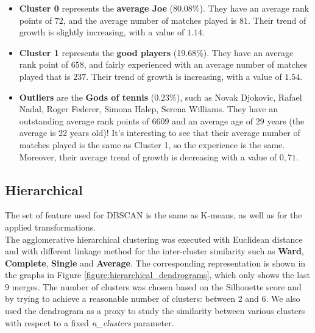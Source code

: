 \begin{itemize}
    \item \textbf{Cluster 0} represents the \textbf{average Joe} (80.08\%). They have an average rank points of $72$, and the average number of matches played is $81$. Their trend of growth is slightly increasing, with a value of $1.14$.
    \item \textbf{Cluster 1} represents the \textbf{good players} (19.68\%). They have an average rank point of $658$, and fairly experienced with an average number of matches played that is $237$. Their trend of growth is increasing, with a value of $1.54$.
    \item \textbf{Outliers} are the \textbf{Gods of tennis} (0.23\%), such as Novak Djokovic, Rafael Nadal, Roger Federer, Simona Halep, Serena Williams. They have an outstanding average rank points of $6609$ and an average age of $29$ years (the average is 22 years old)! It's interesting to see that their average number of matches played is the same as Cluster 1, so the experience is the same. Moreover, their average trend of growth is decreasing with a value of $0,71$.
\end{itemize}	

\subsection{Hierarchical}
\label{sec:hierarchical}
The set of feature used for DBSCAN is the same as K-means, as well as for the applied transformations.\\
The agglomerative hierarchical clustering was executed with Euclidean distance and with different linkage method for the inter-cluster similarity such as \textbf{Ward}, \textbf{Complete}, \textbf{Single} and \textbf{Average}. The corresponding representation is shown in the graphs in Figure \ref{figure:hierarchical_dendrograms}, which only shows the last 9 merges.
The number of clusters was chosen based on the Silhouette score and by trying to achieve a reasonable number of clusters: between 2 and 6. We also used the dendrogram as a proxy to study the similarity between various clusters with respect to a fixed \textit{n\_clusters} parameter.\\

